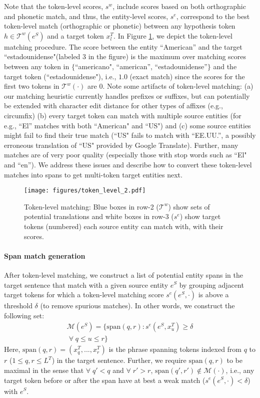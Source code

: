 \documentclass[11pt,a4paper]{article}
\begin{document}
Note that the token-level scores, $s^w$, include scores based on both orthographic and phonetic match, and thus, the entity-level scores, $s^e$, correspond to the best token-level match (orthographic or phonetic) between any hypothesis token $h \in \mathcal{T}^{w}(e^S)$ and a target token $x^T_l$.
In Figure \ref{fig:tok-level}, we depict the token-level matching procedure. 
The score between the entity ``American''
and the target ``estadounidense"(labeled 3 in the figure) 
is the maximum over matching scores between 
any token in $\{$``americano", ``american'',  ``estadounidense''$\}$ 
and the target token (``estadounidense"), i.e., $1.0$ (exact match) 
since the scores for the first two tokens in $\mathcal{T}^w(\cdot)$ are $0$. 
Note some artifacts of token-level matching: (a) our matching heuristic currently handles prefixes or suffixes, but can potentially be extended with character edit distance for other types of affixes (e.g., circumfix)
(b) every target token can match with multiple source entities 
(for e.g., ``El'' matches with both ``American" and ``US") 
and (c) some source entities might fail to find their true match 
(``US" fails to match with ``EE.UU.'', 
a possibly erroneous translation of ``US" provided by Google Translate). 
Further, many matches are of very poor quality 
(especially those with stop words such as ``El" and ``en''). 
We address these issues and describe how to convert these token-level matches 
into spans to get multi-token target entities next.

\begin{figure}[t!]
    \centering
    \texttt{[image: figures/token\_level\_2.pdf]}
    \caption{Token-level matching: Blue boxes in row-2 ($\mathcal{T}^w$) show sets of potential translations and white boxes in row-3 ($s^e$) show target tokens (numbered) each source entity can match with, with their scores.}
\label{fig:tok-level}
\end{figure}



\paragraph{Span match generation \label{sec:span-match}}
After token-level matching, we construct a list 
of potential entity spans in the target sentence 
that match with a given source entity $e^S$ 
by grouping adjacent target tokens for which a token-level matching score $s^e(e^S, \cdot)$ is above a threshold $\delta$ (to remove spurious matches).
In other words, we construct the following set:
\begin{align*}
    \mathcal{M}(e^S) = \{\text{span}(q,r) : s^{e}(e^S, x^T_{u}) \geq \delta \\
    \; \forall \; q \leq u \leq r \}
\end{align*}
Here, $\text{span}(q,r) = (x^T_{q},...,x^T_{r})$ 
is the phrase spanning tokens indexed from $q$ to $r$ 
($1 \leq q, r \leq L^T$) in the target sentence.
Further, we require $\text{span}(q, r)$ to be maximal 
in the sense that $\forall \; q'<q$ and $\forall \; r'>r$, $\text{span}(q',r') \notin \mathcal{M}(\cdot)$, i.e., 
any target token before or after the span 
have at best a weak match ($s^{e}(e^S, \cdot) < \delta$) with $e^S$.
\end{document}
